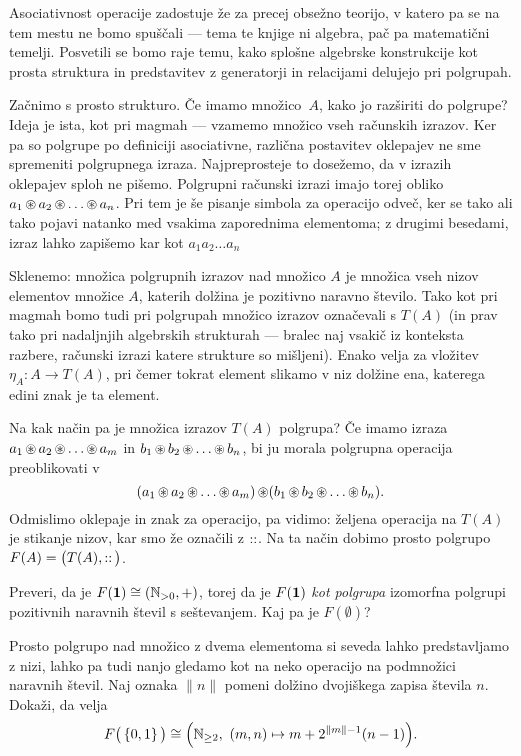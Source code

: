 Asociativnost operacije zadostuje že za precej obsežno teorijo, v katero pa se na tem mestu ne bomo spuščali --- tema te knjige ni algebra, pač pa matematični temelji. Posvetili se bomo raje temu, kako splošne algebrske konstrukcije kot prosta struktura in predstavitev z generatorji in relacijami delujejo pri polgrupah.

Začnimo s prosto strukturo. Če imamo množico~$A$, kako jo razširiti do polgrupe? Ideja je ista, kot pri magmah --- vzamemo množico vseh računskih izrazov. Ker pa so polgrupe po definiciji asociativne, različna postavitev oklepajev ne sme spremeniti polgrupnega izraza. Najpreprosteje to dosežemo, da v izrazih oklepajev sploh ne pišemo. Polgrupni računski izrazi imajo torej obliko $a_1 \mathop{\circledast}\nolimits a_2 \mathop{\circledast}\nolimits \ldots \mathop{\circledast}\nolimits a_n$. Pri tem je še pisanje simbola za operacijo odveč, ker se tako ali tako pojavi natanko med vsakima zaporednima elementoma; z drugimi besedami, izraz lahko zapišemo kar kot $a_1 a_2 \ldots a_n$

Sklenemo: množica polgrupnih izrazov nad množico $A$ je množica vseh nizov elementov množice $A$, katerih dolžina je pozitivno naravno število. Tako kot pri magmah bomo tudi pri polgrupah množico izrazov označevali s $T(A)$ (in prav tako pri nadaljnjih algebrskih strukturah --- bralec naj vsakič iz konteksta razbere, računski izrazi katere strukture so mišljeni). Enako velja za vložitev $\eta_A\colon A \to T(A)$, pri čemer tokrat element slikamo v niz dolžine ena, katerega edini znak je ta element.

Na kak način pa je množica izrazov $T(A)$ polgrupa? Če imamo izraza $a_1 \mathop{\circledast}\nolimits a_2 \mathop{\circledast}\nolimits \ldots \mathop{\circledast}\nolimits a_m$ in $b_1 \mathop{\circledast}\nolimits b_2 \mathop{\circledast}\nolimits \ldots \mathop{\circledast}\nolimits b_n$, bi ju morala polgrupna operacija preoblikovati v
\[(a_1 \mathop{\circledast}\nolimits a_2 \mathop{\circledast}\nolimits \ldots \mathop{\circledast}\nolimits a_m) \mathop{\circledast}\nolimits (b_1 \mathop{\circledast}\nolimits b_2 \mathop{\circledast}\nolimits \ldots \mathop{\circledast}\nolimits b_n).\]
Odmislimo oklepaje in znak za operacijo, pa vidimo: željena operacija na $T(A)$ je stikanje nizov, kar smo že označili z $\mathop{::}\nolimits$. Na ta način dobimo prosto polgrupo $F(A) = \big(T(A), \mathop{::}\nolimits\big)$.

\begin{naloga}\label{naloga:prosta-polgrupa-nad-enojcem}
Preveri, da je $F(\mathtt{\mathbf{1}}) \cong (\mathbb{N}_{> 0}, +)$, torej da je $F(\mathtt{\mathbf{1}})$ \emph{kot polgrupa} izomorfna polgrupi pozitivnih naravnih števil s seštevanjem. Kaj pa je $F(\emptyset)$?
\end{naloga}

\begin{naloga}
Prosto polgrupo nad množico z dvema elementoma si seveda lahko predstavljamo z nizi, lahko pa tudi nanjo gledamo kot na neko operacijo na podmnožici naravnih števil. Naj oznaka $\lVert{n}\rVert$ pomeni dolžino dvojiškega zapisa števila $n$. Dokaži, da velja
\[F\big(\set{0, 1}\big) \ism \Big(\NN_{\geq 2},\ (m, n) \mapsto m + 2^{\lVert{m}\rVert-1} (n-1)\Big).\]
\end{naloga}

